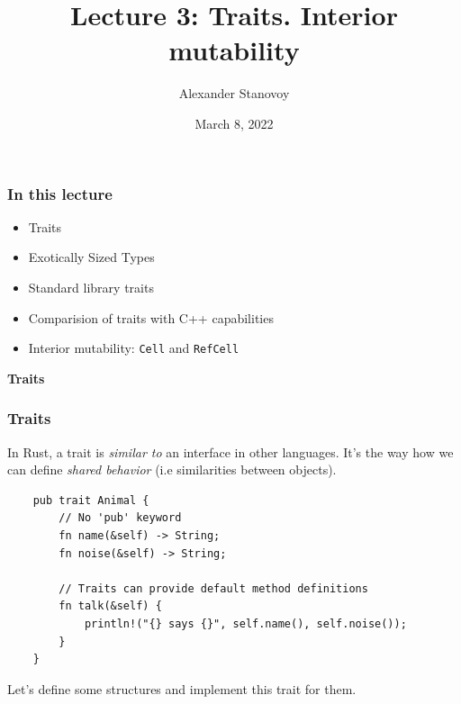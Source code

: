 \documentclass[aspectratio=1610,t]{beamer}
\title{Lecture 3: Traits. Interior mutability}
\date{March 8, 2022}
\author{Alexander Stanovoy}
\institute{alex.stanovoy@gmail.com}
\begin{document}

\begin{frame}
\maketitle
\end{frame}


\begin{frame}[fragile]
\frametitle{In this lecture}
\begin{itemize}
    \item Traits
    \item Exotically Sized Types
    \item Standard library traits
    \item Comparision of traits with C++ capabilities
    \item Interior mutability: \texttt{Cell} and \texttt{RefCell}
\end{itemize}
\end{frame}


\begin{frame}[c]
\centering\Huge\textbf{Traits}
\end{frame}


\begin{frame}[fragile]
\frametitle{Traits}
In Rust, a trait is \textit{similar to} an interface in other languages. It's the way how we can define \textit{shared behavior} (i.e similarities between objects).

\begin{verbatim}
    pub trait Animal {
        // No 'pub' keyword
        fn name(&self) -> String;
        fn noise(&self) -> String;

        // Traits can provide default method definitions
        fn talk(&self) {
            println!("{} says {}", self.name(), self.noise());
        }
    }
\end{verbatim}

Let's define some structures and implement this trait for them.
\end{frame}

\end{document}
